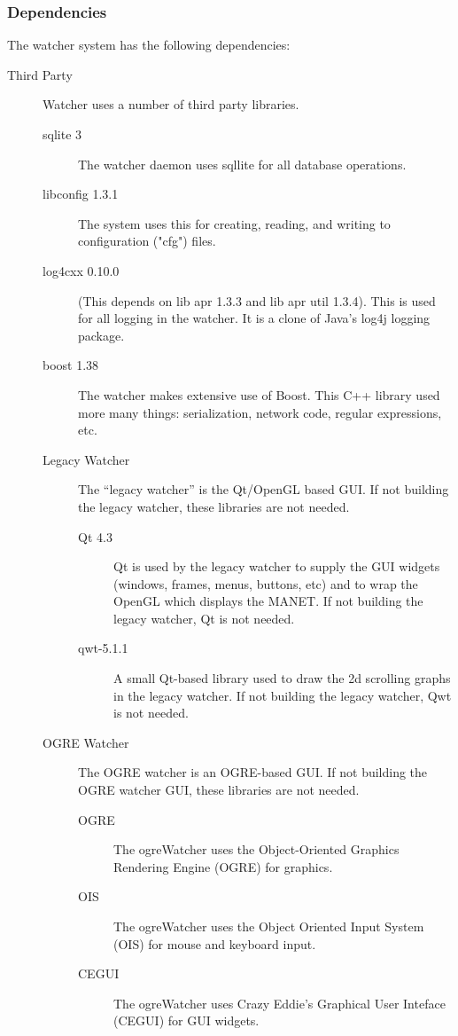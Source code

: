 \documentclass{article}
\begin{document}
\subsubsection{Dependencies}
The watcher system has the following dependencies:
\begin{description}
\item[Third Party] Watcher uses a number of third party libraries. 
\begin{description}
\item[sqlite 3] The watcher daemon uses sqllite for all database operations. 
\item[libconfig 1.3.1] The system uses this for creating, reading, and writing to configuration ("cfg") files. 
\item[log4cxx 0.10.0] (This depends on lib apr 1.3.3 and lib apr util 1.3.4). This is used for all logging in the watcher.  It is a clone of Java's log4j logging package. 
\item[boost 1.38] The watcher makes extensive use of Boost. This C++ library used more many things: serialization, network code, regular expressions, etc. 
\item[Legacy Watcher] The ``legacy watcher'' is the Qt\slash OpenGL based GUI. If not building the legacy watcher, these libraries are not needed. 
\begin{description}
\item[Qt 4.3] Qt is used by the legacy watcher to supply the GUI widgets (windows, frames, menus, buttons, etc) and to wrap the OpenGL which displays the MANET. If not building the legacy watcher, 
    Qt is not needed. 
\item[qwt-5.1.1] A small Qt-based library used to draw the 2d scrolling graphs in the legacy watcher. If not building the legacy watcher, Qwt is not needed.
\end{description}
\item[OGRE Watcher] The OGRE watcher is an OGRE-based GUI. If not building the OGRE watcher GUI, these libraries are not needed. 
\begin{description}
\item[OGRE] The ogreWatcher uses the Object-Oriented Graphics Rendering Engine (OGRE) for graphics. 
\item[OIS] The ogreWatcher uses the Object Oriented Input System (OIS) for mouse and keyboard input. 
\item[CEGUI] The ogreWatcher uses Crazy Eddie's Graphical User Inteface (CEGUI) for GUI widgets. 
\end{description}

\end{description}
\end{description}
\end{document}
